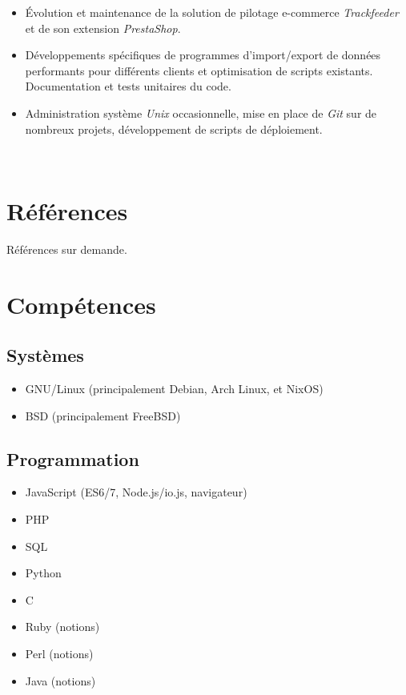 \documentclass[a4paper]{article}
\begin{document}
\begin{itemize}
  \item Évolution et maintenance de la solution de pilotage e-commerce
  \textit{Trackfeeder} et de son extension \textit{PrestaShop}.
  \item Développements spécifiques de programmes d'import/export de
  données performants pour différents clients et optimisation de scripts
  existants. Documentation et tests unitaires du code.
  \item Administration système \textit{Unix} occasionnelle, mise en
  place de \textit{Git} sur de nombreux projets, développement de
  scripts de déploiement.

\end{itemize}



~

\section*{Références}

Références sur demande.

\clearpage

\section*{Compétences}

\subsection*{Systèmes}

\begin{itemize}
  \item GNU/Linux (principalement Debian, Arch Linux, et NixOS)
  \item BSD (principalement FreeBSD)
\end{itemize}

\subsection*{Programmation}

\begin{itemize}
  \item JavaScript (ES6/7, Node.js/io.js, navigateur)
  \item PHP
  \item SQL
  \item Python
  \item C
  \item Ruby (notions)
  \item Perl (notions)
  \item Java (notions)
\end{itemize}
\end{document}
